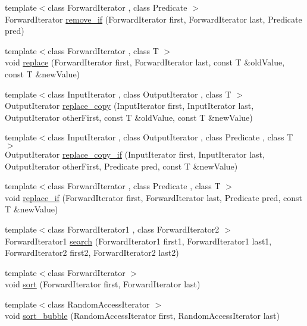 \begin{DoxyCompactItemize}
\item 
{\footnotesize template$<$class Forward\+Iterator , class Predicate $>$ }\\Forward\+Iterator \hyperlink{namespaceprism_a2e9d25191ed83ea0a193f16d9c0a00b7}{remove\+\_\+if} (Forward\+Iterator first, Forward\+Iterator last, Predicate pred)
\item 
{\footnotesize template$<$class Forward\+Iterator , class T $>$ }\\void \hyperlink{namespaceprism_a6156070b98de7130b8c912ae3a6d333f}{replace} (Forward\+Iterator first, Forward\+Iterator last, const T \&old\+Value, const T \&new\+Value)
\item 
{\footnotesize template$<$class Input\+Iterator , class Output\+Iterator , class T $>$ }\\Output\+Iterator \hyperlink{namespaceprism_a16d85ecb70d2f216714a0146a057a105}{replace\+\_\+copy} (Input\+Iterator first, Input\+Iterator last, Output\+Iterator other\+First, const T \&old\+Value, const T \&new\+Value)
\item 
{\footnotesize template$<$class Input\+Iterator , class Output\+Iterator , class Predicate , class T $>$ }\\Output\+Iterator \hyperlink{namespaceprism_a55d702599739f7137516dcd095119f15}{replace\+\_\+copy\+\_\+if} (Input\+Iterator first, Input\+Iterator last, Output\+Iterator other\+First, Predicate pred, const T \&new\+Value)
\item 
{\footnotesize template$<$class Forward\+Iterator , class Predicate , class T $>$ }\\void \hyperlink{namespaceprism_af118c19f6b5448319eb3aaf2d556ac54}{replace\+\_\+if} (Forward\+Iterator first, Forward\+Iterator last, Predicate pred, const T \&new\+Value)
\item 
{\footnotesize template$<$class Forward\+Iterator1 , class Forward\+Iterator2 $>$ }\\Forward\+Iterator1 \hyperlink{namespaceprism_affcb3e5150d72d9f79b85b9ea4eb41e2}{search} (Forward\+Iterator1 first1, Forward\+Iterator1 last1, Forward\+Iterator2 first2, Forward\+Iterator2 last2)
\item 
{\footnotesize template$<$class Forward\+Iterator $>$ }\\void \hyperlink{namespaceprism_a9bf397cad0a67b67fbd1ecddf40d405e}{sort} (Forward\+Iterator first, Forward\+Iterator last)
\item 
{\footnotesize template$<$class Random\+Access\+Iterator $>$ }\\void \hyperlink{namespaceprism_aa597d262eb2f9ef80703c883a2d18d1e}{sort\+\_\+bubble} (Random\+Access\+Iterator first, Random\+Access\+Iterator last)

\end{DoxyCompactItemize}
